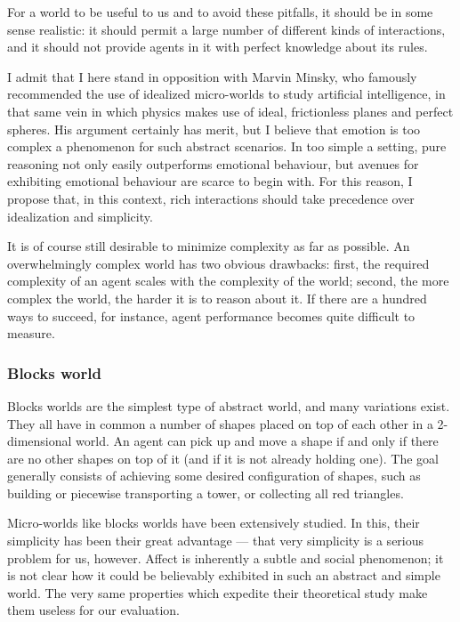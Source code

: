 For a world to be useful to us and to avoid these pitfalls, it should be in some sense realistic: it should permit a large number of different kinds of interactions, and it should not provide agents in it with perfect knowledge about its rules. 

I admit that I here stand in opposition with Marvin Minsky, who famously recommended the use of idealized micro-worlds to study artificial intelligence, in that same vein in which physics makes use of ideal, frictionless planes and perfect spheres. His argument certainly has merit, but I believe that emotion is too complex a phenomenon for such abstract scenarios. In too simple a setting, pure reasoning not only easily outperforms emotional behaviour, but avenues for exhibiting emotional behaviour are scarce to begin with. For this reason, I propose that, in this context, rich interactions should take precedence over idealization and simplicity.

It is of course still desirable to minimize complexity as far as possible. An overwhelmingly complex world has two obvious drawbacks: first, the required complexity of an agent scales with the complexity of the world; second, the more complex the world, the harder it is to reason about it. If there are a hundred ways to succeed, for instance, agent performance becomes quite difficult to measure.

\subsubsection{Blocks world}

Blocks worlds are the simplest type of abstract world, and many variations exist. They all have in common a number of shapes placed on top of each other in a 2-dimensional world. An agent can pick up and move a shape if and only if there are no other shapes on top of it (and if it is not already holding one). The goal generally consists of achieving some desired configuration of shapes, such as building or piecewise transporting a tower, or collecting all red triangles. 

Micro-worlds like blocks worlds have been extensively studied. In this, their simplicity has been their great advantage --- that very simplicity is a serious problem for us, however. Affect is inherently a subtle and social phenomenon; it is not clear how it could be believably exhibited in such an abstract and simple world. The very same properties which expedite their theoretical study make them useless for our evaluation.

